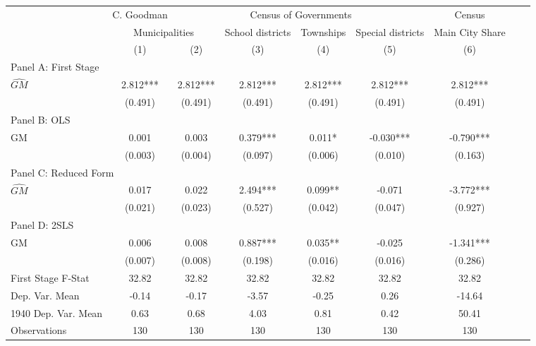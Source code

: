  \begin{tabular}{l*{8}{c}} \toprule
&\multicolumn{1}{c}{C. Goodman}&\multicolumn{4}{c}{Census of Governments}&\multicolumn{1}{c}{Census}\\\cmidrule(lr){2-2}\cmidrule(lr){3-6}\cmidrule(lr){7-7}
&\multicolumn{2}{c}{Municipalities}&\multicolumn{1}{c}{School districts}&\multicolumn{1}{c}{Townships}&\multicolumn{1}{c}{Special districts}&\multicolumn{1}{c}{Main City Share}\\\cmidrule(lr){2-3}\cmidrule(lr){4-6}\cmidrule(lr){7-7}
&\multicolumn{1}{c}{(1)}&\multicolumn{1}{c}{(2)}&\multicolumn{1}{c}{(3)}&\multicolumn{1}{c}{(4)}&\multicolumn{1}{c}{(5)}&\multicolumn{1}{c}{(6)}\\
\cmidrule(lr){1-7}
\multicolumn{6}{l}{Panel A: First Stage}\\
\cmidrule(lr){1-7}
$\widehat{GM}$  &    2.812***&    2.812***&    2.812***&    2.812***&    2.812***&    2.812***\\
                &  (0.491)   &  (0.491)   &  (0.491)   &  (0.491)   &  (0.491)   &  (0.491)   \\
\cmidrule(lr){1-7}
\multicolumn{6}{l}{Panel B: OLS}\\
\cmidrule(lr){1-7}
GM              &    0.001   &    0.003   &    0.379***&    0.011*  &   -0.030***&   -0.790***\\
                &  (0.003)   &  (0.004)   &  (0.097)   &  (0.006)   &  (0.010)   &  (0.163)   \\
\cmidrule(lr){1-7}
\multicolumn{6}{l}{Panel C: Reduced Form}\\
\cmidrule(lr){1-7}
$\widehat{GM}$  &    0.017   &    0.022   &    2.494***&    0.099** &   -0.071   &   -3.772***\\
                &  (0.021)   &  (0.023)   &  (0.527)   &  (0.042)   &  (0.047)   &  (0.927)   \\
\cmidrule(lr){1-7}
\multicolumn{6}{l}{Panel D: 2SLS}\\
\cmidrule(lr){1-7}
GM              &    0.006   &    0.008   &    0.887***&    0.035** &   -0.025   &   -1.341***\\
                &  (0.007)   &  (0.008)   &  (0.198)   &  (0.016)   &  (0.016)   &  (0.286)   \\
\midrule
First Stage F-Stat&    32.82   &    32.82   &    32.82   &    32.82   &    32.82   &    32.82   \\
Dep. Var. Mean  &    -0.14   &    -0.17   &    -3.57   &    -0.25   &     0.26   &   -14.64   \\
1940 Dep. Var. Mean&     0.63   &     0.68   &     4.03   &     0.81   &     0.42   &    50.41   \\
Observations    &      130   &      130   &      130   &      130   &      130   &      130   \\
 \bottomrule \end{tabular}
